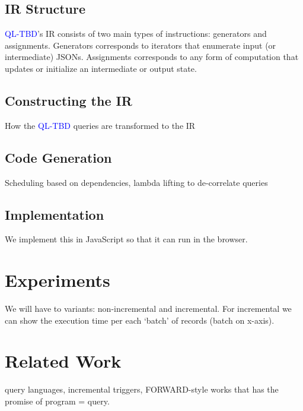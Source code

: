 \documentclass[runningheads]{llncs}
\newcommand{\lang}{\textcolor{blue}{QL-TBD}}
\begin{document}
\subsection{IR Structure}

\lang{}'s IR consists of two main types of instructions: generators and assignments.
Generators corresponds to iterators that enumerate input (or intermediate) JSONs.
Assignments corresponds to any form of computation that updates or initialize an
intermediate or output state.

\subsection{Constructing the IR}
How the \lang{} queries are transformed to the IR

\subsection{Code Generation}
Scheduling based on dependencies, lambda lifting to de-correlate queries

\subsection{Implementation}
We implement this in JavaScript so that it can run in the browser.





\section{Experiments}\label{sec:experiments}
We will have to variants: non-incremental and incremental.
For incremental we can show the execution time per each `batch' of
records (batch on x-axis).


\section{Related Work}\label{sec:related_work}
query languages, incremental triggers, FORWARD-style works that has the promise
of program = query.
\end{document}
